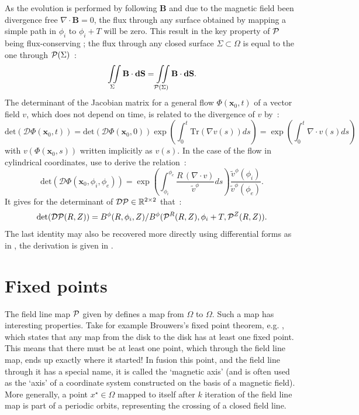 As the evolution is performed by following $\mathbf{B}$ and due to the magnetic field been divergence free $\nabla\cdot\textbf{B} = 0$, the flux through any surface obtained by mapping a simple path in $\phi_i$ to $\phi_i + T$ will be zero. This result in the key property of $\mathcal{P}$ being flux-conserving ; the flux through any closed surface $\Sigma \subset \Omega$ is equal to the one through $\mathcal{P}(\Sigma)$~:
\begin{equation*}
    \iint\limits_{\Sigma}\textbf{B}\cdot\textbf{dS} = \iint\limits_{\mathcal{P}(\Sigma)}\textbf{B}\cdot\textbf{dS}.
\end{equation*}
The determinant of the Jacobian matrix for a general flow $\Phi(\textbf{x}_0, t)$ of a vector field $v$, which does not depend on time, is related to the divergence of $v$ \cite[p.408]{hirsch_differential_2013} by~:
\begin{equation}\label{eq:det-div-flow}
    \text{det}(\mathcal{D}\Phi(\textbf{x}_0, t)) = \text{det}(\mathcal{D}\Phi(\textbf{x}_0, 0))\exp\left(\int_0^t\text{Tr}(\nabla v(s)) ds\right) = \exp\left(\int_0^t \nabla\cdot v(s) ds\right)
\end{equation}
with $v(\Phi(\textbf{x}_0, s))$ written implicitly as $v(s)$. In the case of the flow in cylindrical coordinates, \citeauthor{wei_invariant_2023} use  to derive the relation~:
\begin{equation*}\label{eq:det-div-pmap}
    \text{det}(\mathcal{D}\Phi(\textbf{x}_0, \phi_i, \phi_e)) = \exp\left(\int_{\phi_i}^{\phi_e} \frac{R\,(\nabla\cdot v)}{\tilde{v}^\phi} ds\right)\frac{\tilde{v}^\phi(\phi_i)}{\tilde{v}^\phi(\phi_e)}.
\end{equation*}
It gives for the determinant of $\mathcal{D}\mathcal{P} \in \mathbb{R}^{2\times2}$ that~:
\begin{equation}\label{eq:pmap-det}
    \text{det}(\mathcal{D}\mathcal{P}(R, Z)) = B^\phi(R,\phi_i, Z)/B^\phi(\mathcal{P}^{R}(R,Z), \phi_i+T,\mathcal{P}^{Z}(R,Z)).
\end{equation}
The last identity may also be recovered more directly using differential forms as in \cite{meiss_thirty_2015}, the derivation is given in .

\section{Fixed points}

The field line map $\mathcal{P}$ given by  defines a map from $\Omega$ to $\Omega$. Such a map has interesting properties. Take for example Brouwers's fixed point theorem, e.g. \cite{michel_chipot_handbook_2008}, which states that any map from the disk to the disk has at least one fixed point. This means that there must be at least one point, which through the field line map, ends up exactly where it started! In fusion this point, and the field line through it has a special name, it is called the `magnetic axis' (and is often used as the `axis' of a coordinate system constructed on the basis of a magnetic field). More generally, a point $x^\star\in\Omega$ mapped to itself after $k$ iteration of the field line map is part of a periodic orbits, representing the crossing of a closed field line.

